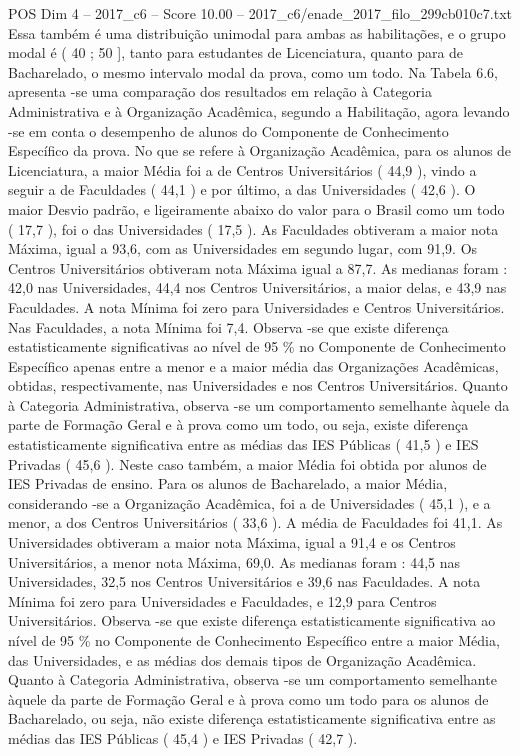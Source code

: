 \begin{textsample}{POS Dim 4 – 2017\_c6 – Score 10.00 – 2017\_c6/enade\_2017\_filo\_299cb010c7.txt}
Essa também é uma distribuição unimodal para ambas as habilitações, e o grupo modal é ( 40 ; 50 ], tanto para estudantes de Licenciatura, quanto para de Bacharelado, o mesmo intervalo modal da prova, como um todo.
Na Tabela 6.6, apresenta -se uma comparação dos resultados em relação à Categoria Administrativa e à Organização Acadêmica, segundo a Habilitação, agora levando -se em conta o desempenho de alunos do Componente de Conhecimento Específico da prova.
No que se refere à Organização Acadêmica, para os alunos de Licenciatura, a maior Média foi a de Centros Universitários ( 44,9 ), vindo a seguir a de Faculdades ( 44,1 ) e por último, a das Universidades ( 42,6 ).
O maior Desvio padrão, e ligeiramente abaixo do valor para o Brasil como um todo ( 17,7 ), foi o das Universidades ( 17,5 ).
As Faculdades obtiveram a maior nota Máxima, igual a 93,6, com as Universidades em segundo lugar, com 91,9.
Os Centros Universitários obtiveram nota Máxima igual a 87,7.
As medianas foram : 42,0 nas Universidades, 44,4 nos Centros Universitários, a maior delas, e 43,9 nas Faculdades.
A nota Mínima foi zero para Universidades e Centros Universitários.
Nas Faculdades, a nota Mínima foi 7,4.
Observa -se que existe diferença estatisticamente significativas ao nível de 95 \% no Componente de Conhecimento Específico apenas entre a menor e a maior média das Organizações Acadêmicas, obtidas, respectivamente, nas Universidades e nos Centros Universitários.
Quanto à Categoria Administrativa, observa -se um comportamento semelhante àquele da parte de Formação Geral e à prova como um todo, ou seja, existe diferença estatisticamente significativa entre as médias das IES Públicas ( 41,5 ) e IES Privadas ( 45,6 ).
Neste caso também, a maior Média foi obtida por alunos de IES Privadas de ensino.
Para os alunos de Bacharelado, a maior Média, considerando -se a Organização Acadêmica, foi a de Universidades ( 45,1 ), e a menor, a dos Centros Universitários ( 33,6 ).
A média de Faculdades foi 41,1.
As Universidades obtiveram a maior nota Máxima, igual a 91,4 e os Centros Universitários, a menor nota Máxima, 69,0.
As medianas foram : 44,5 nas Universidades, 32,5 nos Centros Universitários e 39,6 nas Faculdades.
A nota Mínima foi zero para Universidades e Faculdades, e 12,9 para Centros Universitários.
Observa -se que existe diferença estatisticamente significativa ao nível de 95 \% no Componente de Conhecimento Específico entre a maior Média, das Universidades, e as médias dos demais tipos de Organização Acadêmica.
Quanto à Categoria Administrativa, observa -se um comportamento semelhante àquele da parte de Formação Geral e à prova como um todo para os alunos de Bacharelado, ou seja, não existe diferença estatisticamente significativa entre as médias das IES Públicas ( 45,4 ) e IES Privadas ( 42,7 ).

\end{textsample}
